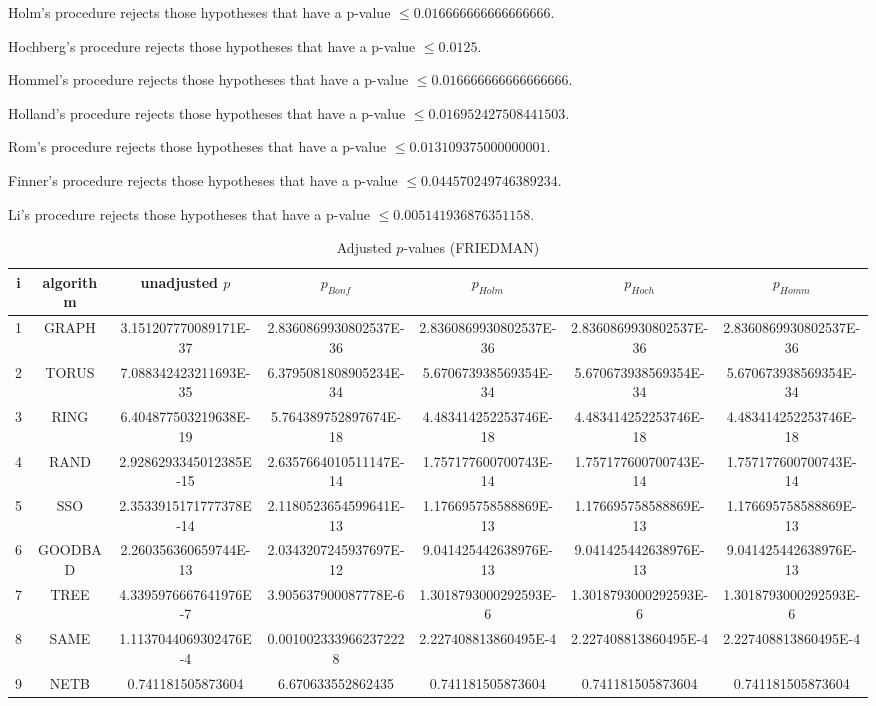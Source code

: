 \documentclass[a4paper,10pt]{article}
\begin{document}
\begin{landscape}
Holm's procedure rejects those hypotheses that have a p-value $\le0.016666666666666666$.


Hochberg's procedure rejects those hypotheses that have a p-value $\le0.0125$.


Hommel's procedure rejects those hypotheses that have a p-value $\le0.016666666666666666$.


Holland's procedure rejects those hypotheses that have a p-value $\le0.016952427508441503$.


Rom's procedure rejects those hypotheses that have a p-value $\le0.013109375000000001$.


Finner's procedure rejects those hypotheses that have a p-value $\le0.044570249746389234$.


Li's procedure rejects those hypotheses that have a p-value $\le0.005141936876351158$.



\newpage

\begin{table}[!htp]
\centering\scriptsize
\caption{Adjusted $p$-values (FRIEDMAN)}
\begin{tabular}{ccccccc}
i&algorithm&unadjusted $p$&$p_{Bonf}$&$p_{Holm}$&$p_{Hoch}$&$p_{Homm}$\\
\hline
1& GRAPH&3.151207770089171E-37&2.8360869930802537E-36&2.8360869930802537E-36&2.8360869930802537E-36&2.8360869930802537E-36\\
2& TORUS&7.088342423211693E-35&6.3795081808905234E-34&5.670673938569354E-34&5.670673938569354E-34&5.670673938569354E-34\\
3& RING&6.404877503219638E-19&5.764389752897674E-18&4.483414252253746E-18&4.483414252253746E-18&4.483414252253746E-18\\
4& RAND&2.9286293345012385E-15&2.6357664010511147E-14&1.757177600700743E-14&1.757177600700743E-14&1.757177600700743E-14\\
5& SSO&2.3533915171777378E-14&2.1180523654599641E-13&1.176695758588869E-13&1.176695758588869E-13&1.176695758588869E-13\\
6& GOODBAD&2.260356360659744E-13&2.0343207245937697E-12&9.041425442638976E-13&9.041425442638976E-13&9.041425442638976E-13\\
7& TREE&4.3395976667641976E-7&3.905637900087778E-6&1.3018793000292593E-6&1.3018793000292593E-6&1.3018793000292593E-6\\
8& SAME&1.1137044069302476E-4&0.0010023339662372228&2.227408813860495E-4&2.227408813860495E-4&2.227408813860495E-4\\
9& NETB&0.741181505873604&6.670633552862435&0.741181505873604&0.741181505873604&0.741181505873604\\
\hline
\end{tabular}
\end{table}


\end{landscape}
\end{document}
